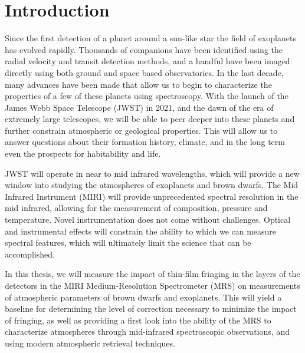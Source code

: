 \newcommand{\bpic}{$\beta$ Pic b }
\newcommand{\mj}{M$_{j}$}
\chapter{Introduction}
Since the first detection of a planet around a sun-like star \parencite{Mayor1995} the field of exoplanets has evolved rapidly.
Thousands of companions have been identified using the radial velocity and transit detection methods, and a handful have been imaged directly using both ground and space based observatories.
In the last decade, many advances have been made that allow us to begin to characterize the properties of a few of these planets using spectroscopy.
With the launch of the James Webb Space Telescope (JWST) in 2021, and the dawn of the era of extremely large telescopes, we will be able to peer deeper into these planets and further constrain atmospheric or geological properties. 
This will allow us to answer questions about their formation history, climate, and in the long term even the prospects for habitability and life.

JWST will operate in near to mid infrared wavelengths, which will provide a new window into studying the atmospheres of exoplanets and brown dwarfs. 
The Mid Infrared Instrument (MIRI) will provide unprecedented spectral resolution in the mid infrared, allowing for the measurement of composition, pressure and temperature. 
Novel instrumentation does not come without challenges. 
Optical and instrumental effects will constrain the ability to which we can measure spectral features, which will ultimately limit the science that can be accomplished.

In this thesis, we will measure the impact of thin-film fringing in the layers of the detectors in the MIRI Medium-Resolution Spectrometer (MRS) on measurements of atmospheric parameters of brown dwarfs and exoplanets.
This will yield a baseline for determining the level of correction necessary to minimize the impact of fringing, as well as providing a first look into the ability of the MRS to characterize atmospheres through mid-infrared spectroscopic observations, and using modern atmospheric retrieval techniques.

